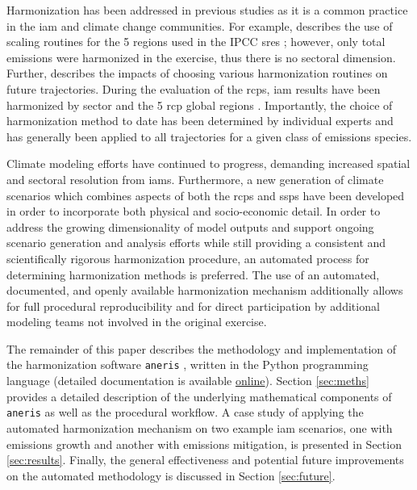 \documentclass[review]{elsarticle}
\newcommand{\code}[1]{\lstinline[basicstyle=\ttfamily\color{black}]|#1|}
\begin{document}
Harmonization has been addressed in previous studies as it is a common practice
in the \gls{iam} and climate change communities. For example,
\cite{meinshausen_rcp_2011} describes the use of scaling routines for the 5
regions used in the IPCC \gls{sres} \cite{nakicenovic2000}; however, only total
emissions were harmonized in the exercise, thus there is no sectoral
dimension. Further, \cite{rogelj_discrepancies_2011} describes the impacts of
choosing various harmonization routines on future trajectories. During the
evaluation of the \glspl{rcp}, \gls{iam}
results have been harmonized by sector and the 5 \gls{rcp} global regions
\cite{vuuren_representative_2011}. Importantly, the choice of harmonization
method to date has been determined by individual experts and has generally been
applied to all trajectories for a given class of emissions species.

Climate modeling efforts have continued to progress, demanding increased spatial
and sectoral resolution from \glspl{iam}. Furthermore, a new generation of climate
scenarios which combines aspects of both the \glspl{rcp} and \glspl{ssp} have been developed
in order to incorporate both physical and socio-economic detail. In order to
address the growing dimensionality of model outputs and support ongoing scenario
generation and analysis efforts while still providing a consistent and
scientifically rigorous harmonization procedure, an automated process for
determining harmonization methods is preferred. The use of an automated,
documented, and openly available harmonization mechanism additionally allows for
full procedural reproducibility and for direct participation by additional
modeling teams not involved in the original exercise.

The remainder of this paper describes the methodology and implementation of the
harmonization software \code{aneris} \cite{matthew_gidden_2017_802832}, written
in the Python programming language (detailed documentation is available
\href{http://mattgidden.com/aneris/}{online}). Section \ref{sec:meths} provides
a detailed description of the underlying mathematical components of
\code{aneris} as well as the procedural workflow. A case study of applying the
automated harmonization mechanism on two example \gls{iam} scenarios, one with
emissions growth and another with emissions mitigation, is presented in Section
\ref{sec:results}. Finally, the general effectiveness and potential future
improvements on the automated methodology is discussed in Section
\ref{sec:future}.
\end{document}
